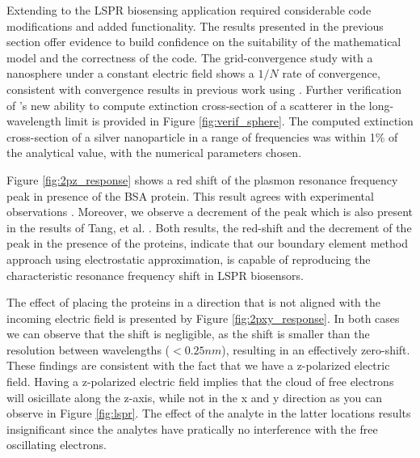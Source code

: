 
Extending \pygbe to the LSPR biosensing application required considerable code 
modifications and added functionality. The results presented in the previous section 
offer evidence to build confidence on the suitability of the mathematical model 
and the correctness of the code.
The grid-convergence study with a nanosphere under a constant electric field 
shows a $1/N$ rate of convergence, consistent with convergence results 
in previous work using \pygbe \cite{CooperBardhanBarba2013}.
Further verification of \pygbe's new ability to compute extinction cross-section
of a scatterer in the long-wavelength limit is provided in Figure \ref{fig:verif_sphere}.
The computed extinction cross-section of a silver nanoparticle in a range of frequencies 
was within 1\% of the analytical value, with the numerical parameters chosen.



Figure \ref{fig:2pz_response} shows a red shift of the plasmon resonance frequency peak in presence of the BSA protein.
This result agrees with experimental observations
\cite{TangETal2010, RaphaelETal2013}. Moreover, we observe a decrement of 
the peak which is also present in the results of Tang, et al. \cite{TangETal2010}.
Both results, the red-shift and the decrement of the peak in the presence of 
the proteins, indicate that our boundary element method approach using electrostatic
approximation, is capable of reproducing the characteristic resonance frequency 
shift in LSPR biosensors.

The effect of placing the proteins in a direction that is not aligned with the incoming electric field
is presented by Figure \ref{fig:2pxy_response}. In both cases we can observe that the shift is negligible, 
as the shift is smaller than the resolution between wavelengths ($< 0.25 nm$), resulting in an
effectively zero-shift. These findings are consistent with 
the fact that we have a z-polarized electric field. Having a z-polarized electric
field implies that the cloud of free electrons will osicillate along the z-axis, while 
not in the x and y direction as you can observe in Figure \ref{fig:lspr}. The
effect of the analyte in the latter locations results insignificant since the 
analytes have pratically no interference with the free oscillating electrons. 

